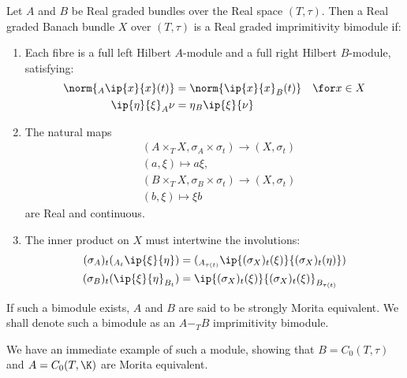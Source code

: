 \begin{definition}
	Let $A$ and $B$ be Real graded \Cstar bundles over the Real space $(T,\tau)$. Then a Real graded Banach bundle $X$ over $(T,\tau)$ is a Real graded imprimitivity bimodule if:
\begin{enumerate}
\item 
	Each fibre is a full left Hilbert $A$-module and a full right Hilbert $B$-module, satisfying:
\begin{align*}
	\norm{{}_A\ip{x}{x}(t)}&=\norm{\ip{x}{x}_B(t)}\quad \for x\in X \\
	\ip{\eta}{\xi}_A\nu&=\eta {}_B\ip{\xi}{\nu}
\end{align*}
	\item
		The natural maps
	\begin{align*}
		&(A\times_T X,\sigma_A\times \sigma_t)\to (X,\sigma_t) \\
		&(a,\xi)\mapsto a\xi, \\
		&(B\times_T X,\sigma_B\times \sigma_t)\to (X,\sigma_t) \\
		&(b,\xi)\mapsto \xi b
	\end{align*}
	are Real and continuous.
\item
	The inner product on $X$ must intertwine the involutions:
	\begin{align*}
		(\sigma_A)_t(_{A_t}\ip{\xi}{\eta})&=(_{A_{\tau(t)}}\ip{(\sigma_X)_t(\xi)}{(\sigma_X)_t(\eta)}) \\
		(\sigma_B)_t(\ip{\xi}{\eta}_{B_t})&=\ip{(\sigma_X)_t(\xi)}{(\sigma_X)_t(\xi)}_{B_{\tau(t)}}
	\end{align*}
\end{enumerate}
	If such a bimodule exists, $A$ and $B$ are said to be strongly Morita equivalent. We shall denote such a bimodule as an $A-_T B$ imprimitivity bimodule.
\end{definition}
\noindent We have an immediate example of such a module, showing that $B=C_0(T,\tau)$ and $A=C_0(T,\K)$ are Morita equivalent. 
